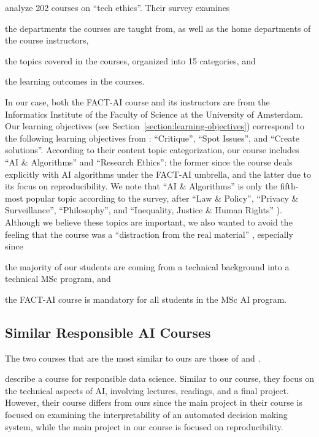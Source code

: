 \documentclass[letterpaper]{article}
\newcommand{\OurUniversity}{the University of Amsterdam}
\begin{document}
\citet{fiesler2020we} analyze 202 courses on ``tech ethics''.
Their survey examines
\begin{enumerate*}[label=(\roman*)]
\item the departments the courses are taught from, as well as the home departments of the course instructors,
\item the topics covered in the courses, organized into 15 categories, and
\item the learning outcomes in the courses.
\end{enumerate*}
In our case, both the FACT-AI course and its instructors are from the Informatics Institute of the Faculty of Science at \OurUniversity{}. Our learning objectives (see Section~\ref{section:learning-objectives}) correspond to the following learning objectives from \citet{fiesler2020we}: ``Critique'', ``Spot Issues'', and ``Create solutions''.
According to their content topic categorization, our course includes ``AI \& Algorithms'' and ``Research Ethics'': the former since the course deals explicitly with \ac{AI} algorithms under the FACT-AI umbrella, and the latter due to its focus on reproducibility.
We note that ``AI \& Algorithms'' is only the fifth-most popular topic according to the survey, after ``Law \& Policy'', ``Privacy \& Surveillance'', ``Philosophy'', and ``Inequality, Justice \& Human Rights'' \citep[see Table 2,][]{fiesler2020we}).
Although we believe these topics are important, we also wanted to avoid the feeling that the course was a ``distraction from the real material'' \cite{lewis2021teaching}, especially since
\begin{enumerate*}[label=(\roman*)]
\item the majority of our students are coming from a technical background into a technical MSc program, and
\item the FACT-AI course is mandatory for all students in the MSc AI program.
\end{enumerate*}

\subsection{Similar Responsible AI Courses}
The two courses that are the most similar to ours are those of \citet{lewis2021teaching} and \citet{yildiz2021reproducedpapers}.

\citet{lewis2021teaching} describe a course for responsible data science.
Similar to our course, they focus on the technical aspects of AI, involving lectures, readings, and a final project.
However, their course differs from ours since the main project in their course is focused on examining the interpretability of an automated decision making system, while the main project in our course is focused on reproducibility.
\end{document}
